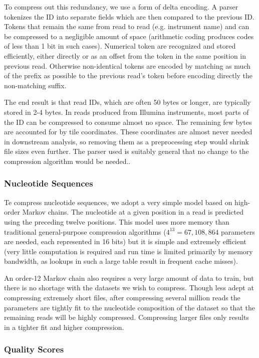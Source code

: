 \documentclass[twocolumn]{article}
\begin{document}
To compress out this redundancy, we use a form of delta encoding. A  parser
tokenizes the ID into separate fields which are then compared to the previous
ID. Tokens that remain the same from read to read (e.g. instrument name) and
can be compressed to a negligible amount of space (arithmetic coding produces
codes of less than 1 bit in such cases). Numerical token are recognized and
stored efficiently, either directly or as an offset from the token in the same
position in previous read. Otherwise non-identical tokens are encoded by
matching as much of the prefix as possible to the previous read's token before
encoding directly the non-matching suffix.

The end result is that read IDs, which are often 50 bytes or longer, are
typically stored in 2-4 bytes. In reads produced from Illumina instruments,
most parts of the ID can be compressed to consume almost no space. The
remaining few bytes are accounted for by tile coordinates. These coordinates
are almost never needed in downstream analysis, so removing them as a
preprocessing step would shrink file sizes even further. The parser used is
suitably general that no change to the compression algorithm would be needed..


\subsubsection{Nucleotide Sequences}

Te compress nucleotide sequences, we adopt a very simple model based on high-
order Markov chains. The nucleotide at a given position in a read is predicted
using the preceding twelve positions. This model uses more memory than
traditional general-purpose compression algorithms ($4^{13} = 67,108,864$
parameters are needed, each represented in 16 bits)  but it is simple and
extremely efficient (very little computation is required and run time is
limited primarily by memory bandwidth, as lookups in such a large table result
in frequent cache misses).

An order-12 Markov chain also requires a very large amount of
data to train, but there is no shortage with the datasets we wish to
compress. Though less adept at compressing extremely short files,
after compressing several million reads the parameters are tightly
fit to the nucleotide composition of the dataset so that the remaining reads
will be highly compressed. Compressing larger files only results in a tighter
fit and higher compression.


\subsubsection{Quality Scores}
\end{document}
